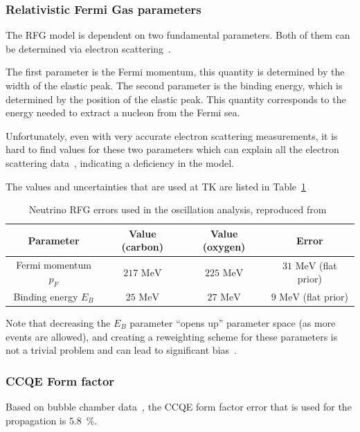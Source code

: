 \clearpage

\subsubsection{Relativistic Fermi Gas parameters}
The \Gls{RFG} model is dependent on two fundamental parameters. Both
of them can be determined via electron
scattering~\cite{Alvarez-Ruso:2017oui}.

The first parameter is the Fermi momentum, this quantity is determined
by the width of the elastic peak. The second parameter is the binding
energy, which is determined by the position of the elastic peak. This
quantity corresponds to the energy needed to extract a nucleon from
the Fermi sea.

Unfortunately, even with very accurate electron scattering
measurements, it is hard to find values for these two parameters which
can explain all the electron scattering data~\cite{TN315}, indicating
a deficiency in the model.

The values and uncertainties that are used at \Gls{TK} are listed in
Table~\ref{tab:rfgerror}

\begin{table}[ht]
  \begin{adjustbox}{center}
    \begin{tabular}{cccc}
      \toprule
      Parameter & Value (carbon) & Value (oxygen) & Error \\
      \midrule
      Fermi momentum $p_F$ & $217\text{~MeV}$ & $225\text{~MeV}$ & $31\text{~MeV}$ (flat prior)\\
      Binding energy $E_B$ & $25\text{~MeV}$  & $27\text{~MeV}$  & $9\text{~MeV}$  (flat prior)\\
      \bottomrule
    \end{tabular}
  \end{adjustbox}
  \begin{center}
    \caption[Neutrino RFG errors]{Neutrino \Gls{RFG} errors used
      in the oscillation analysis, reproduced from~\cite{TN315}}
    \label{tab:rfgerror}
  \end{center}
\end{table}

Note that decreasing the $E_B$ parameter ``opens up'' parameter space
(as more events are allowed), and creating a reweighting scheme for
these parameters is not a trivial problem and can lead to significant
bias~\cite{TN315}.

\subsubsection{CCQE Form factor}
Based on bubble chamber data~\cite{ANLCCQE,BNLCCQE,CERNCCQE}, the
\Gls{CCQE} form factor error that is used for the propagation is
$5.8$~\%.

